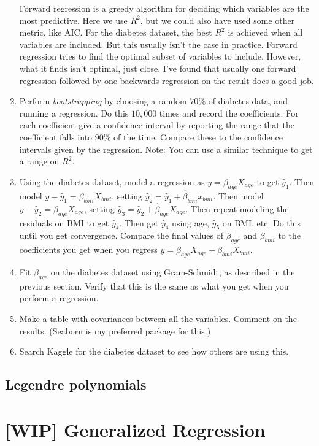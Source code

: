 \documentclass{amsbook}
\begin{document}
\begin{enumerate}
Forward regression is a greedy algorithm for deciding which variables are the most predictive.  Here we use $R^2$, but we could also have used some other metric, like AIC.  For the diabetes dataset, the best $R^2$ is achieved when all variables are included.  But this usually isn't the case in practice.  Forward regression tries to find the optimal subset of variables to include.  However, what it finds isn't optimal, just close.  I've found that usually one forward regression followed by one backwards regression on the result does a good job.
\item Perform {\em bootstrapping} by choosing a random $70\%$ of diabetes data, and running a regression.  Do this $10,000$ times and record the coefficients.  For each coefficient give a confidence interval by reporting the range that the coefficient falls into $90\%$ of the time.  Compare these to the confidence intervals given by the regression.  Note:  You can use a similar technique to get a range on $R^2$.
\item Using the diabetes dataset, model a regression as $y=\beta_{age}X_{age}$ to get $\hat y_1$.  Then model $y-\hat y_1=\beta_{bmi}X_{bmi}$, setting $\hat y_2=\hat y_1+\hat\beta_{bmi}x_{bmi}$.  Then model $y-\hat y_2=\beta_{age}X_{age}$, setting $\hat y_3=\hat y_2+\hat\beta_{age}X_{age}$.  Then repeat modeling the residuals on BMI to get $\hat y_4$.  Then get $\hat y_4$ using age, $\hat y_5$ on BMI, etc.  Do this until you get convergence.  Compare the final values of $\beta_{age}$ and $\beta_{bmi}$ to the coefficients you get when you regress $y=\beta_{age}X_{age}+\beta_{bmi}X_{bmi}$.
\item Fit $\beta_{age}$ on the diabetes dataset using Gram-Schmidt, as described in the previous section.  Verify that this is the same as what you get when you perform a regression.
\item Make a table with covariances between all the variables.  Comment on the results.  (Seaborn is my preferred package for this.)
\item Search Kaggle for the diabetes dataset to see how others are using this.
\end{enumerate}

\section{Legendre polynomials}

\chapter{[WIP] Generalized Regression}
\end{document}
